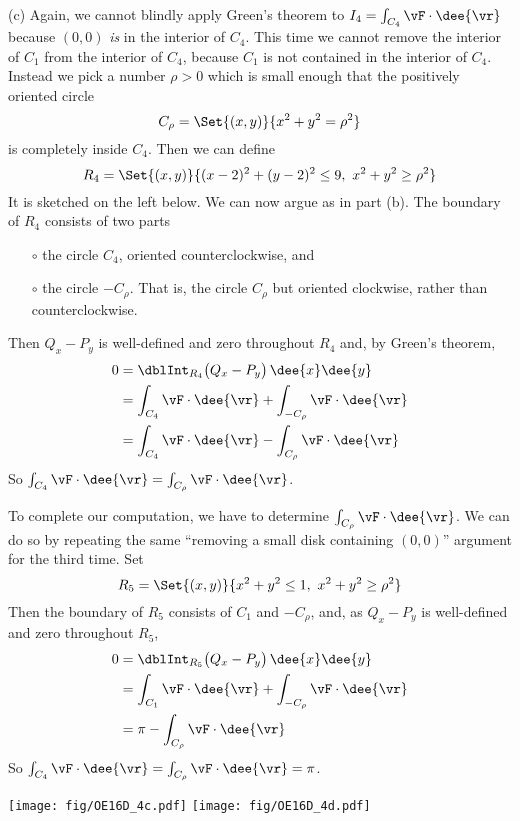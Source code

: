 \begin{solution}
(c) Again, we cannot blindly apply Green's theorem
to $I_4=\int_{C_4}\vF\cdot\dee{\vr}$
because $(0,0)$ \emph{is} in the interior of $C_4$. This time
we cannot remove the interior of $C_1$ from the interior of $C_4$,
because $C_1$ is not contained in the interior of $C_4$. Instead
we pick a number $\rho>0$ which is small enough that the
positively oriented circle
\begin{equation*}
C_\rho = \Set{(x,y)}{x^2+y^2=\rho^2}
\end{equation*}
is completely inside $C_4$. Then we can define
\begin{equation*}
R_4 = \Set{(x,y)}{(x-2)^2 + (y - 2)^2 \le 9,\ x^2+y^2\ge \rho^2}
\end{equation*}
It is sketched on the left below. We can now argue as in part (b).
The boundary of $R_4$ consists of two parts
\begin{itemize}\itemsep1pt \parskip0pt  %
\item[$\circ$]
the circle $C_4$, oriented counterclockwise, and
\item[$\circ$]
the circle $-C_\rho$. That is, the circle $C_\rho$ but oriented clockwise,
rather than counterclockwise.
\end{itemize}
Then $Q_x-P_y$ is well-defined and zero throughout $R_4$ and,
by Green's theorem,
\begin{align*}
   0 &=\dblInt_{R_4} \big(Q_x-P_y\big)\,\dee{x}\dee{y} \\
    &= \int_{C_4} \vF\cdot\dee{\vr}
             + \int_{-C_\rho} \vF\cdot\dee{\vr} \\
    &= \int_{C_4} \vF\cdot\dee{\vr}
             - \int_{C_\rho} \vF\cdot\dee{\vr}
\end{align*}
So $\int_{C_4} \vF\cdot\dee{\vr} = \int_{C_\rho} \vF\cdot\dee{\vr}$.

To complete our computation, we have to determine
$\int_{C_\rho} \vF\cdot\dee{\vr}$. We can do so by repeating the
same ``removing a small disk containing $(0,0)$'' argument for the third time.
Set
\begin{equation*}
R_5 = \Set{(x,y)}{x^2 + y^2 \le 1,\ x^2+y^2\ge \rho^2}
\end{equation*}
Then the boundary of $R_5$ consists of $C_1$ and $-C_\rho$,
and, as $Q_x-P_y$ is well-defined and zero throughout $R_5$,
\begin{align*}
   0 &=\dblInt_{R_5} \big(Q_x-P_y\big)\,\dee{x}\dee{y} \\
    &= \int_{C_1} \vF\cdot\dee{\vr}
             + \int_{-C_\rho} \vF\cdot\dee{\vr} \\
    &= \pi
             - \int_{C_\rho} \vF\cdot\dee{\vr}
\end{align*}
So $\int_{C_4} \vF\cdot\dee{\vr} = \int_{C_\rho} \vF\cdot\dee{\vr}=\pi$.

\begin{center}
     \texttt{[image: fig/OE16D\_4c.pdf]}\qquad
     \texttt{[image: fig/OE16D\_4d.pdf]}
\end{center}
\end{solution}

